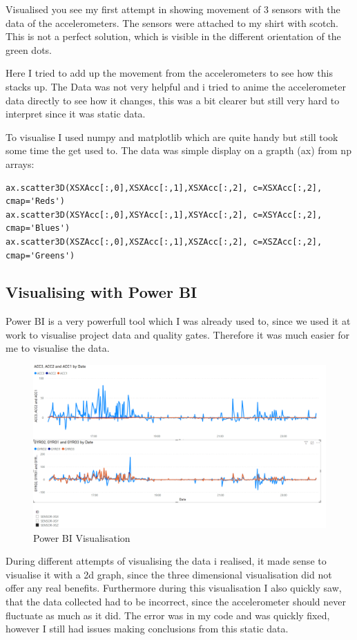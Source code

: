 Visualised you see my first attempt in showing movement of 3 sensors with the data of the accelerometers. The sensors were attached to my shirt with scotch. This is not a perfect solution, which is visible in the different orientation of the green dots. 

Here I tried to add up the movement from the accelerometers to see how this stacks up. The Data was not very helpful and i tried to anime the accelerometer data directly to see how it changes, this was a bit clearer but still very hard to interpret since it was static data. 

To visualise I used numpy and matplotlib which are quite handy but still took some time the get used to.
The data was simple display on a grapth (ax) from np arrays:

\begin{lstlisting}
ax.scatter3D(XSXAcc[:,0],XSXAcc[:,1],XSXAcc[:,2], c=XSXAcc[:,2], cmap='Reds')
ax.scatter3D(XSYAcc[:,0],XSYAcc[:,1],XSYAcc[:,2], c=XSYAcc[:,2], cmap='Blues')
ax.scatter3D(XSZAcc[:,0],XSZAcc[:,1],XSZAcc[:,2], c=XSZAcc[:,2], cmap='Greens')
\end{lstlisting}

\subsection{Visualising with Power BI}

\gls{Power BI} is a very powerfull tool which I was already used to, since we used it at work to visualise project data and quality gates. Therefore it was much easier for me to visualise the data.

\begin{figure}[h]
\begin{center}
\includegraphics[width=0.7\linewidth]{images/PowerBIVisualisiation.png}
  \end{center}
  \caption{Power BI Visualisation}
  \label{fig:PowerBIVisualisation}
\end{figure}

During different attempts of visualising the data i realised, it made sense to visualise it with a 2d graph, since the three dimensional visualisation did not offer any real benefits. Furthermore during this visualisation I also quickly saw, that the data collected had to be incorrect, since the accelerometer should never fluctuate as much as it did. The error was in my code and was quickly fixed, however I still had issues making conclusions from this static data.

\newpage